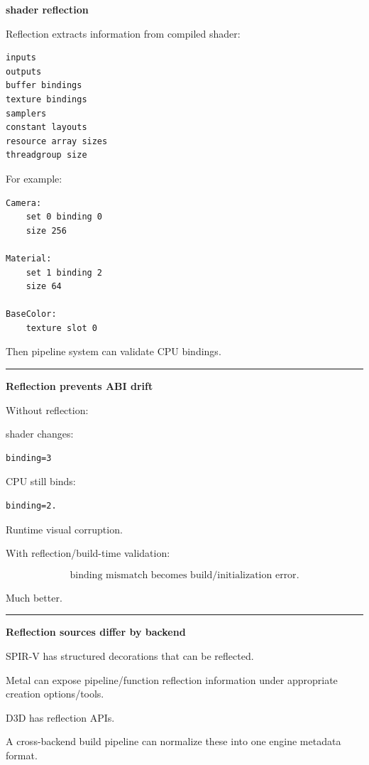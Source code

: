 \textbf{shader reflection}

Reflection extracts information from compiled shader:

\begin{verbatim}
inputs
outputs
buffer bindings
texture bindings
samplers
constant layouts
resource array sizes
threadgroup size
\end{verbatim}

For example:

\begin{verbatim}
Camera:
    set 0 binding 0
    size 256

Material:
    set 1 binding 2
    size 64

BaseColor:
    texture slot 0
\end{verbatim}

Then pipeline system can validate CPU bindings.

\begin{center}\rule{0.5\linewidth}{0.5pt}\end{center}

\textbf{Reflection prevents ABI drift}

Without reflection:

shader changes:

\begin{verbatim}
binding=3
\end{verbatim}

CPU still binds:

\begin{verbatim}
binding=2.
\end{verbatim}

Runtime visual corruption.

With reflection/build-time validation:

\[
\boxed{
\text{binding mismatch becomes build/initialization error}.
}
\]

Much better.

\begin{center}\rule{0.5\linewidth}{0.5pt}\end{center}

\textbf{Reflection sources differ by backend}

SPIR-V has structured decorations that can be reflected.

Metal can expose pipeline/function reflection information under appropriate creation options/tools.

D3D has reflection APIs.

A cross-backend build pipeline can normalize these into one engine metadata format.

